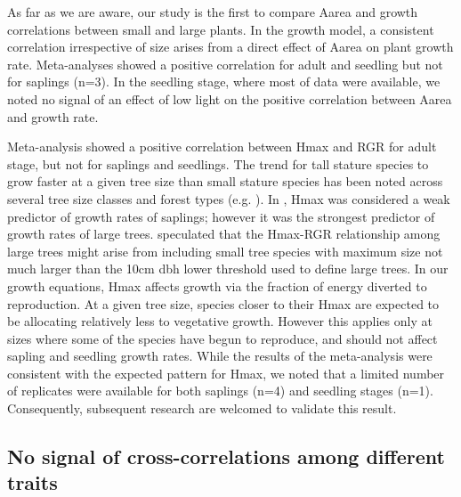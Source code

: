 \documentclass[a4paper,11pt]{article}
\begin{document}
As far as we are aware, our study is the first to compare Aarea and growth correlations between small and large plants. In the growth model, a consistent correlation irrespective of size arises from a direct effect of Aarea on plant growth rate. Meta-analyses showed a positive correlation for adult and seedling but not for saplings (n=3). In the seedling stage, where most of data were available, we noted no signal of an effect of low light on the positive correlation between Aarea and growth rate.

Meta-analysis showed a positive correlation between Hmax and RGR for adult stage, but not for saplings and seedlings. The trend for tall stature species to grow faster at a given tree size than small stature species has been noted across several tree size classes and forest types (e.g. \citealt{Thomas:1996do,Poorter:2008iu,Wright:2010tp,Herault:2011dd,Ruger:2012jv,Iida:2014ep}). In \citet{Wright:2010tp}, Hmax was considered a weak predictor of growth rates of saplings; however it was the strongest predictor of growth rates of large trees. \citet{Poorter:2008iu} speculated that the Hmax-RGR relationship among large trees might arise from including small tree species with maximum size not much larger than the 10cm dbh lower threshold used to define large trees. In our growth equations, Hmax affects growth via the fraction of energy diverted to reproduction. At a given tree size, species closer to their Hmax are expected to be allocating relatively less to vegetative growth. However this applies only at sizes where some of the species have begun to reproduce, and should not affect sapling and seedling growth rates. While the results of the meta-analysis were consistent with the expected pattern for Hmax, we noted that a limited number of replicates were available for both saplings (n=4) and seedling stages (n=1). Consequently, subsequent research are welcomed to validate this result. 

\subsection*{No signal of cross-correlations among different traits}
\end{document}
